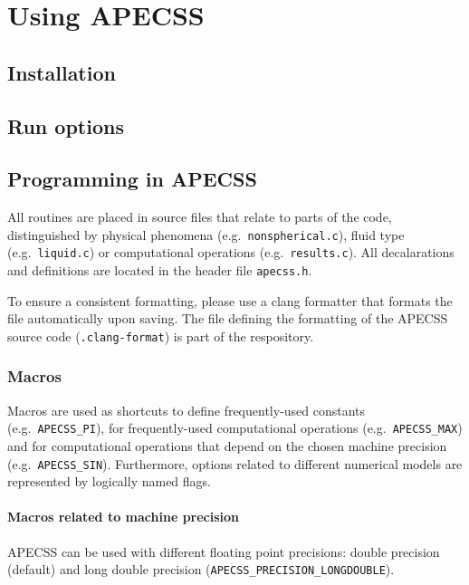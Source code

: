 \chapter{Using APECSS}

\section{Installation}



\section{Run options}

\section{Programming in APECSS}

All routines are placed in source files that relate to parts of the code, distinguished by physical phenomena (e.g.~{\tt nonspherical.c}), fluid type (e.g.~{\tt liquid.c}) or computational operations (e.g.~{\tt results.c}). All decalarations and definitions are located in the header file {\tt apecss.h}. 

To ensure a consistent formatting, please use a clang formatter that formats the file automatically upon saving. The file defining the formatting of the APECSS source code ({\tt .clang-format}) is part of the respository.

\subsection{Macros}

Macros are used as shortcuts to define frequently-used constants (e.g.~{\tt APECSS\_PI}), for frequently-used computational operations (e.g.~{\tt APECSS\_MAX}) and for computational operations that depend on the chosen machine precision (e.g.~{\tt APECSS\_SIN}). Furthermore, options related to different numerical models are represented by logically named flags.

\subsubsection{Macros related to machine precision}

APECSS can be used with different floating point precisions: double precision (default) and long double precision ({\tt APECSS\_PRECISION\_LONGDOUBLE}).

